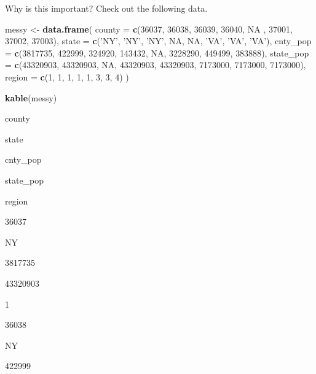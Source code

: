 \documentclass[]{book}
\newenvironment{Shaded}{\begin{snugshade}}{\end{snugshade}}
\newcommand{\KeywordTok}[1]{\textcolor[rgb]{0.13,0.29,0.53}{\textbf{#1}}}
\newcommand{\DataTypeTok}[1]{\textcolor[rgb]{0.13,0.29,0.53}{#1}}
\newcommand{\DecValTok}[1]{\textcolor[rgb]{0.00,0.00,0.81}{#1}}
\newcommand{\StringTok}[1]{\textcolor[rgb]{0.31,0.60,0.02}{#1}}
\newcommand{\OtherTok}[1]{\textcolor[rgb]{0.56,0.35,0.01}{#1}}
\newcommand{\NormalTok}[1]{#1}
\begin{document}
Why is this important? Check out the following data.

\begin{Shaded}
\begin{Highlighting}[]
\NormalTok{messy <-}\StringTok{ }\KeywordTok{data.frame}\NormalTok{(}
  \DataTypeTok{county =} \KeywordTok{c}\NormalTok{(}\DecValTok{36037}\NormalTok{, }\DecValTok{36038}\NormalTok{, }\DecValTok{36039}\NormalTok{, }\DecValTok{36040}\NormalTok{, }\OtherTok{NA}\NormalTok{ , }\DecValTok{37001}\NormalTok{, }\DecValTok{37002}\NormalTok{, }\DecValTok{37003}\NormalTok{),}
  \DataTypeTok{state =} \KeywordTok{c}\NormalTok{(}\StringTok{'NY'}\NormalTok{, }\StringTok{'NY'}\NormalTok{, }\StringTok{'NY'}\NormalTok{, }\OtherTok{NA}\NormalTok{, }\OtherTok{NA}\NormalTok{, }\StringTok{'VA'}\NormalTok{, }\StringTok{'VA'}\NormalTok{, }\StringTok{'VA'}\NormalTok{),}
  \DataTypeTok{cnty_pop =} \KeywordTok{c}\NormalTok{(}\DecValTok{3817735}\NormalTok{, }\DecValTok{422999}\NormalTok{, }\DecValTok{324920}\NormalTok{, }\DecValTok{143432}\NormalTok{, }\OtherTok{NA}\NormalTok{, }\DecValTok{3228290}\NormalTok{, }\DecValTok{449499}\NormalTok{, }\DecValTok{383888}\NormalTok{),}
  \DataTypeTok{state_pop =} \KeywordTok{c}\NormalTok{(}\DecValTok{43320903}\NormalTok{, }\DecValTok{43320903}\NormalTok{, }\OtherTok{NA}\NormalTok{, }\DecValTok{43320903}\NormalTok{, }\DecValTok{43320903}\NormalTok{, }\DecValTok{7173000}\NormalTok{, }\DecValTok{7173000}\NormalTok{, }\DecValTok{7173000}\NormalTok{),}
  \DataTypeTok{region =} \KeywordTok{c}\NormalTok{(}\DecValTok{1}\NormalTok{, }\DecValTok{1}\NormalTok{, }\DecValTok{1}\NormalTok{, }\DecValTok{1}\NormalTok{, }\DecValTok{1}\NormalTok{, }\DecValTok{3}\NormalTok{, }\DecValTok{3}\NormalTok{, }\DecValTok{4}\NormalTok{)}
\NormalTok{)}

\KeywordTok{kable}\NormalTok{(messy)}
\end{Highlighting}
\end{Shaded}

county

state

cnty\_pop

state\_pop

region

36037

NY

3817735

43320903

1

36038

NY

422999
\end{document}
